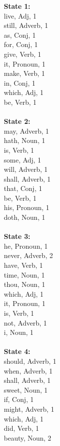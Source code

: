 \begin{multicols}{4}
\noindent\textbf{State 1:}\\
live, Adj, 1\\
still, Adverb, 1\\
as, Conj, 1\\
for, Conj, 1\\
give, Verb, 1\\
it, Pronoun, 1\\
make, Verb, 1\\
in, Conj, 1\\
which, Adj, 1\\
be, Verb, 1\\
\\
\noindent\textbf{State 2:}\\
may, Adverb, 1\\
hath, Noun, 1\\
is, Verb, 1\\
some, Adj, 1\\
will, Adverb, 1\\
shall, Adverb, 1\\
that, Conj, 1\\
be, Verb, 1\\
his, Pronoun, 1\\
doth, Noun, 1\\
\\
\noindent\textbf{State 3:} \\
he, Pronoun, 1\\
never, Adverb, 2\\
have, Verb, 1\\
time, Noun, 1\\
thou, Noun, 1\\
which, Adj, 1\\
it, Pronoun, 1\\
is, Verb, 1\\
not, Adverb, 1\\
i, Noun, 1\\
\\
\noindent\textbf{State 4:} \\
should, Adverb, 1\\
when, Adverb, 1\\
shall, Adverb, 1\\
sweet, Noun, 1\\
if, Conj, 1\\
might, Adverb, 1\\
which, Adj, 1\\
did, Verb, 1\\
beauty, Noun, 2\\

\end{multicols}
